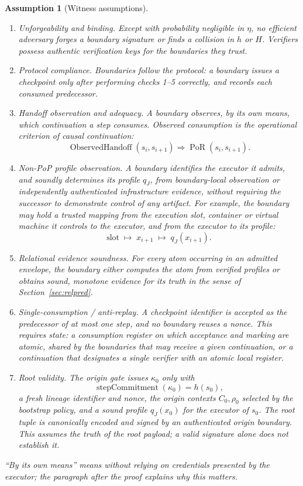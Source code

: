 \documentclass[10pt,twocolumn]{article}
\newcommand{\PoR}{\operatorname{PoR}}
\newtheorem{assumption}{Assumption}
\begin{document}
\begin{assumption}[Witness assumptions]\label{ass:witness}
\leavevmode
\begin{enumerate}
    \item \emph{Unforgeability and binding.} Except with probability negligible
    in \(\eta\), no efficient adversary forges a boundary signature or finds a
    collision in \(h\) or \(H\). Verifiers possess authentic verification keys
    for the boundaries they trust.
    \item \emph{Protocol compliance.} Boundaries follow the protocol: a
    boundary issues a checkpoint only after performing checks 1--5 correctly,
    and records each consumed predecessor.
    \item \emph{Handoff observation and adequacy.} A boundary observes, by its
    own means, which continuation a step consumes. Observed consumption is the
    operational criterion of causal continuation:
    \[
    \operatorname{ObservedHandoff}(s_i,s_{i+1})
    \Longrightarrow
    \PoR(s_i,s_{i+1}).
    \]
    \item \emph{Non-PoP profile observation.} A boundary identifies the
    executor it admits, and soundly determines its profile \(q_J\), from
    boundary-local observation or independently authenticated infrastructure
    evidence, without requiring the successor to demonstrate control of any
    artifact. For example, the boundary may hold a trusted mapping from the
    execution slot, container or virtual machine it controls to the executor,
    and from the executor to its profile:
    \[
    \text{slot}\;\longmapsto\;x_{i+1}\;\longmapsto\;q_J(x_{i+1}).
    \]
    \item \emph{Relational evidence soundness.} For every atom occurring in an
    admitted envelope, the boundary either computes the atom from verified
    profiles or obtains sound, monotone evidence for its truth in the sense of
    Section~\ref{sec:relpred}.
    \item \emph{Single-consumption / anti-replay.} A checkpoint identifier is
    accepted as the predecessor of at most one step, and no boundary reuses a
    nonce. This requires state: a consumption register on which acceptance and
    marking are atomic, shared by the boundaries that may receive a given
    continuation, or a continuation that designates a single verifier with an
    atomic local register.
    \item \emph{Root validity.} The origin gate issues \(\kappa_0\) only with
    \[
    \operatorname{stepCommitment}(\kappa_0)=h(s_0),
    \]
    a fresh lineage
    identifier and nonce, the origin contexts \(C_0,\rho_0\) selected by the
    bootstrap policy, and a sound profile \(q_J(x_0)\) for the executor of
    \(s_0\). The root tuple is canonically encoded and signed by an authenticated
    origin boundary. This assumes the truth of the root payload; a valid
    signature alone does not establish it.
\end{enumerate}
``By its own means'' means without relying on credentials presented by the
executor; the paragraph after the proof explains why this matters.
\end{assumption}
\end{document}
